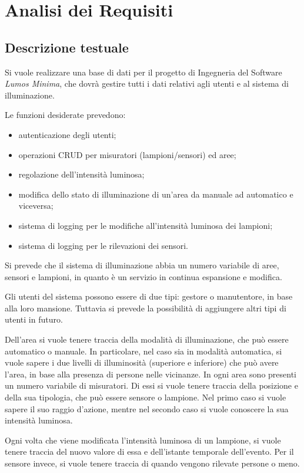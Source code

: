 \chapter{Analisi dei Requisiti}

\section{Descrizione testuale}
Si vuole realizzare una base di dati per il progetto di Ingegneria del Software \textit{Lumos Minima}, che dovrà gestire tutti i dati relativi agli utenti e al sistema di illuminazione.

Le funzioni desiderate prevedono:
\begin{itemize}
    \item autenticazione degli utenti;
    \item operazioni CRUD per misuratori (lampioni/sensori) ed aree;
    \item regolazione dell'intensità luminosa;
    \item modifica dello stato di illuminazione di un'area da manuale ad automatico e viceversa;
    \item sistema di logging per le modifiche all'intensità luminosa dei lampioni;
    \item sistema di logging per le rilevazioni dei sensori.
\end{itemize}

Si prevede che il sistema di illuminazione abbia un numero variabile di aree, sensori e lampioni, in quanto è un servizio in continua espansione e modifica.

Gli utenti del sistema possono essere di due tipi: gestore o manutentore, in base alla loro mansione. Tuttavia si prevede la possibilità di aggiungere altri tipi di utenti in futuro.

Dell'area si vuole tenere traccia della modalità di illuminazione, che può essere automatico o manuale. In particolare, nel caso sia in modalità automatica, si vuole sapere i due livelli di illuminosità (superiore e inferiore) che può avere l'area, in base alla presenza di persone nelle vicinanze.
In ogni area sono presenti un numero variabile di misuratori. Di essi si vuole tenere traccia della posizione e della sua tipologia, che può essere sensore o lampione. Nel primo caso si vuole sapere il suo raggio d'azione, mentre nel secondo caso si vuole conoscere la sua intensità luminosa.

Ogni volta che viene modificata l'intensità luminosa di un lampione, si vuole tenere traccia del nuovo valore di essa e dell'istante temporale dell'evento.
Per il sensore invece, si vuole tenere traccia di quando vengono rilevate persone o meno.